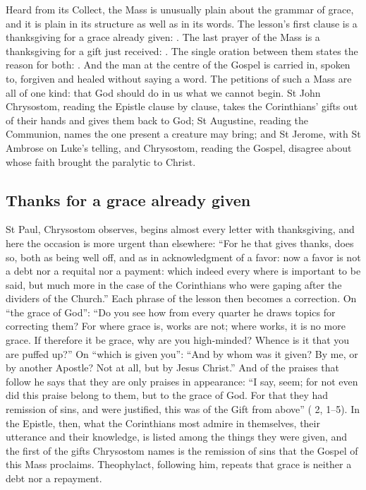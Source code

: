 \label{sec:nothing-of-our-own}

Heard from its Collect, the Mass is unusually plain about the grammar of grace,
and it is plain in its structure as well as in its words. The lesson's first
clause is a thanksgiving for a grace already given: . The last prayer of the
Mass is a thanksgiving for a gift just received: . The single oration between them states the
reason for both: . And the man at
the centre of the Gospel is carried in, spoken to, forgiven and healed without
saying a word. The petitions of such a Mass are all of one kind: that God
should do in us what we cannot begin. St John Chrysostom, reading the Epistle
clause by clause, takes the Corinthians' gifts out of their hands and gives
them back to God; St Augustine, reading the Communion, names the one present a
creature may bring; and St Jerome, with St Ambrose on Luke's telling, and
Chrysostom, reading the Gospel, disagree about whose faith brought the
paralytic to Christ.

\subsection{Thanks for a grace already given}

St Paul, Chrysostom observes, begins almost every letter with thanksgiving, and
here the occasion is more urgent than elsewhere: ``For he that gives thanks,
does so, both as being well off, and as in acknowledgment of a favor: now a
favor is not a debt nor a requital nor a payment: which indeed every where is
important to be said, but much more in the case of the Corinthians who were
gaping after the dividers of the Church.'' Each phrase of the lesson then
becomes a correction. On ``the grace of God'': ``Do you see how from every
quarter he draws topics for correcting them? For where grace is, works are not;
where works, it is no more grace. If therefore it be grace, why are you
high-minded? Whence is it that you are puffed up?'' On ``which is given you'':
``And by whom was it given? By me, or by another Apostle? Not at all, but by
Jesus Christ.'' And of the praises that follow he says that they are only
praises in appearance: ``I say, seem; for not even did this praise belong to
them, but to the grace of God. For that they had remission of sins, and were
justified, this was of the Gift from above'' ( 2, 1--5). In the Epistle, then, what the Corinthians most admire in
themselves, their utterance and their knowledge, is listed among the things
they were given, and the first of the gifts Chrysostom names is the remission
of sins that the Gospel of this Mass proclaims. Theophylact, following him,
repeats that grace is neither a debt nor a repayment.

